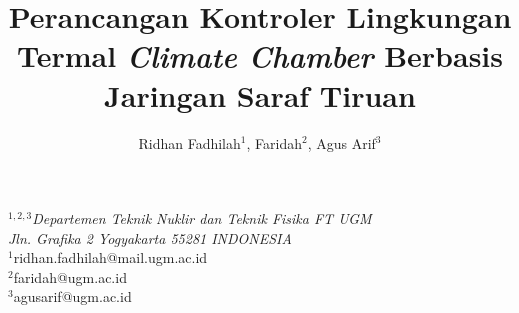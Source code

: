 \documentclass[a4paper,10pt]{article}
\title{\fontsize{24}{28}\selectfont Perancangan Kontroler Lingkungan Termal \textit{Climate Chamber} Berbasis Jaringan Saraf Tiruan}
\author{\fontsize{11}{11}\selectfont Ridhan Fadhilah$^1$, Faridah$^2$, Agus Arif$^3$}
\date{}
\begin{document}
	\setlength{\abovedisplayskip}{1pt}
	\setlength{\belowdisplayskip}{1pt}	
	
	\maketitle
	
	\vspace{-1.5cm}
	
	{\centering
		{\itshape\fontsize{10}{10}\selectfont
			$^{1,2,3}$Departemen Teknik Nuklir dan Teknik Fisika FT UGM\\
			Jln. Grafika 2 Yogyakarta 55281 INDONESIA\\
		}
		{\fontsize{9}{9}\normalfont\selectfont
			$^1$ridhan.fadhilah@mail.ugm.ac.id\\
			$^2$faridah@ugm.ac.id\\
			$^3$agusarif@ugm.ac.id\\
		}
	}
	
	\vspace{0.3cm}
	
\end{document}
